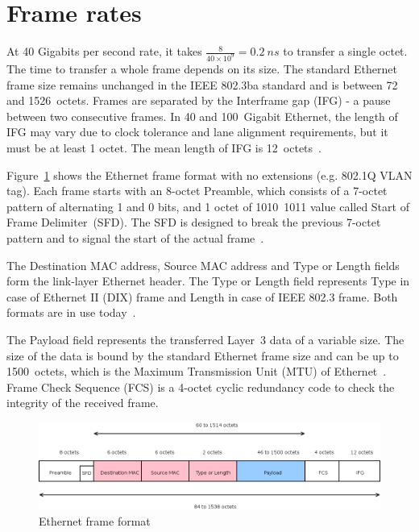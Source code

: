 
\section{Frame rates}\label{sec:40gbe-frame-rates}
At 40 Gigabits per second rate, it takes $\frac{8}{40 \times 10^{9}} = 0.2~ns$ to transfer a single octet.
The time to transfer a whole frame depends on its size.
The standard Ethernet frame size remains unchanged in the IEEE 802.3ba standard and
is between 72 and 1526~octets.
Frames are separated by the Interframe gap (IFG) - a pause between two consecutive frames.
In 40 and 100~Gigabit Ethernet,
the length of IFG may vary due to clock tolerance and lane alignment requirements,
but it must be at least 1 octet.
The mean length of IFG is 12~octets~\cite{ieee-802.3ba}.

Figure~\ref{fig:40gbe-ethernet-frame} shows the Ethernet frame format with no extensions (e.g. 802.1Q VLAN tag).
Each frame starts with an 8-octet Preamble, which consists of a 7-octet pattern of alternating 1 and 0 bits,
and 1 octet of 1010~1011 value called Start of Frame Delimiter~(SFD).
The SFD is designed to break the previous 7-octet pattern and to signal the start of the actual frame~\cite{ieee-802.3ba}.

The Destination MAC address, Source MAC address and Type or Length fields form the link-layer Ethernet header.
The Type or Length field represents Type in case of Ethernet II (DIX) frame
and Length in case of IEEE 802.3 frame.
Both formats are in use today~\cite{understanding-internals}.

The Payload field represents the transferred Layer~3 data of a variable size.
The size of the data is bound by the standard Ethernet frame size and can be up to 1500~octets,
which is the Maximum Transmission Unit (MTU) of Ethernet~\cite{ieee-802.3ba}.
Frame Check Sequence (FCS) is a 4-octet cyclic redundancy code to check the integrity of the received frame.

\begin{figure}
	\centering
	\includegraphics[width=15cm,keepaspectratio]{fig/ethernet-frame.png}
	\caption{Ethernet frame format}
	\label{fig:40gbe-ethernet-frame}
	\bigskip
\end{figure}

